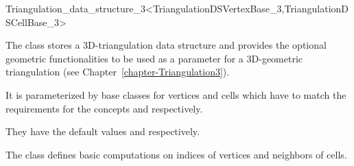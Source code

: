 

\begin{ccRefClass}{Triangulation_data_structure_3<TriangulationDSVertexBase_3,TriangulationDSCellBase_3>}

\ccDefinition
The class  stores a 3D-triangulation data
structure and provides the optional
geometric functionalities to be used as a parameter for a 
3D-geometric triangulation (see Chapter~\ref{chapter-Triangulation3}). 


\ccParameters
It is parameterized by base classes for vertices and cells which have to match
the requirements for the concepts  and
 respectively.

They have the default values  and
 respectively.

\ccIsModel {}


The class  defines basic computations on
indices of vertices and neighbors of cells. 

\ccSeeAlso

\\



\end{ccRefClass}
